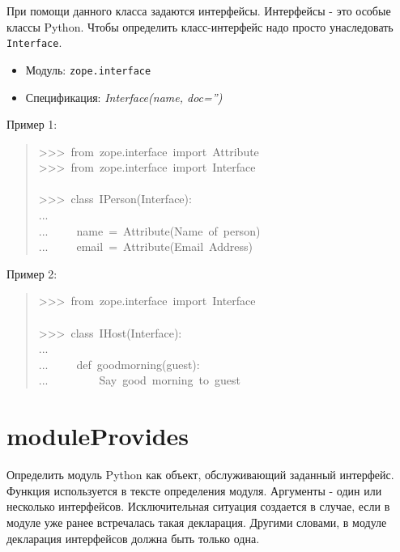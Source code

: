 \documentclass[a4paper,openany,twoside,final]{book}
\providecommand*{\DUroletitlereference}[1]{\textsl{#1}}
\begin{document}
При помощи данного класса задаются интерфейсы. Интерфейсы - это особые
классы Python.  Чтобы определить класс-интерфейс надо просто
унаследовать \texttt{Interface}.

\begin{itemize}

\item Модуль: \texttt{zope.interface}

\item Спецификация: \DUroletitlereference{Interface(name, doc='')}

\end{itemize}

Пример 1:

\begin{quote}{\ttfamily \raggedright \noindent
>{}>{}>~from~zope.interface~import~Attribute\\
>{}>{}>~from~zope.interface~import~Interface\\
~\\
>{}>{}>~class~IPerson(Interface):\\
...\\
...~~~~~name~=~Attribute(\textquotedbl{}Name~of~person\textquotedbl{})\\
...~~~~~email~=~Attribute(\textquotedbl{}Email~Address\textquotedbl{})
}
\end{quote}

Пример 2:

\begin{quote}{\ttfamily \raggedright \noindent
>{}>{}>~from~zope.interface~import~Interface\\
~\\
>{}>{}>~class~IHost(Interface):\\
...\\
...~~~~~def~goodmorning(guest):\\
...~~~~~~~~~\textquotedbl{}\textquotedbl{}\textquotedbl{}Say~good~morning~to~guest\textquotedbl{}\textquotedbl{}\textquotedbl{}
}
\end{quote}


\section*{moduleProvides%
  \label{moduleprovides}%
}

Определить модуль Python как объект, обслуживающий заданный интерфейс.
Функция используется в тексте определения модуля.  Аргументы - один
или несколько интерфейсов.  Исключительная ситуация создается в
случае, если в модуле уже ранее встречалась такая декларация.  Другими
словами, в модуле декларация интерфейсов должна быть только одна.
\end{document}
